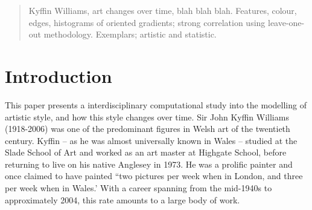 \documentclass[conference,a4paper]{IEEEtran}
\begin{document}




\maketitle


\begin{abstract}
Kyffin Williams, art changes over time, blah blah blah. Features, colour, edges, histograms of oriented gradients; strong correlation using leave-one-out methodology.
Exemplars; artistic and statistic. 
\end{abstract}





%
\IEEEpeerreviewmaketitle



\section{Introduction}

This paper presents a interdisciplinary computational study into the modelling
of artistic style, and how this style changes over time.  Sir John Kyffin
Williams (1918-2006) was one of the predominant figures in Welsh art of the
twentieth century.  Kyffin -- as he was almost universally known in Wales --
studied at the Slade School of Art and worked as an art master at Highgate
School, before returning to live on his native Anglesey in 1973.  He was a
prolific painter and once claimed to have painted ``two pictures per week when
in London, and three per week when in Wales.'\cite[p.209]{Williams1993Across}
With a career spanning from the mid-1940s to approximately 2004, this rate
amounts to a large body of work.
\end{document}

